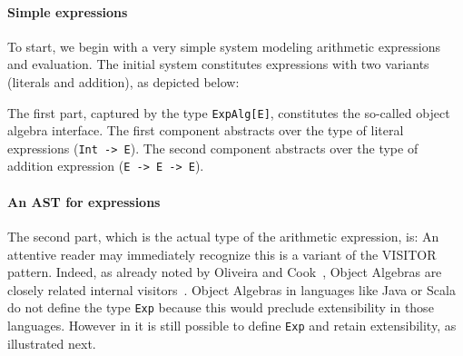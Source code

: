 \begin{comment}
\end{itemize}

Various solutions to the Expression Problem~\cite{wadler1998expression} in the
literature~\cite{finally-tagless,oliveira09modular,DelawareOS13,oliveira2012extensibility,
  swierstra:la-carte} are closely related to type-theoretic encodings of
datatypes. Indeed, variants of the same idea keep appearing in different
programming languages, because the encoding of the idea needs to exploit the
particular features of the programming language (or theorem prover).
Unfortunately language-specific constructs obscure the key ideas behind those
solutions. In this section we presents \name's solution to the Expression
Problem that intends to capture the key ideas of various solutions in the
literature.

\subsection{Extensibility and Subtyping}
\label{sec:extensibility}
\end{comment}

\paragraph{Simple expressions}
To start, we begin with a very simple system modeling arithmetic expressions and
evaluation. The initial system constitutes expressions with two variants
(literals and addition), as depicted below:

The first part, captured by the type \lstinline{ExpAlg[E]}, constitutes the
so-called object algebra interface. The first component abstracts over the type
of literal expressions (\lstinline{Int -> E}). The second component abstracts
over the type of addition expression (\lstinline{E -> E -> E}).

\paragraph{An AST for expressions}
The second part, which is the actual type of the arithmetic expression, is:
An attentive reader may immediately recognize this is a variant of the VISITOR
pattern. Indeed, as already noted by Oliveira and Cook~\cite{}, Object
Algebras are closely related internal visitors~\cite{}. Object
Algebras in languages like Java or Scala do not define the type
\lstinline{Exp} because this would preclude extensibility in those
languages. However in \name it is still possible to define
\lstinline{Exp} and retain extensibility, as illustrated next.

